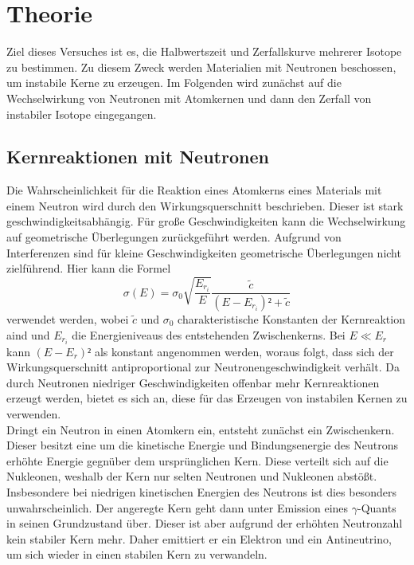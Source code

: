 \section{Theorie}
\label{sec:Theorie}

Ziel dieses Versuches ist es, die Halbwertszeit und Zerfallskurve mehrerer Isotope zu bestimmen.
Zu diesem Zweck werden Materialien mit Neutronen beschossen, um instabile Kerne zu erzeugen. Im 
Folgenden wird zunächst auf die Wechselwirkung von Neutronen mit Atomkernen und dann den Zerfall 
von instabiler Isotope eingegangen.

\subsection{Kernreaktionen mit Neutronen}
    Die Wahrscheinlichkeit für die Reaktion eines Atomkerns eines Materials mit einem Neutron wird
    durch den Wirkungsquerschnitt beschrieben. Dieser ist stark geschwindigkeitsabhängig. Für große 
    Geschwindigkeiten kann die Wechselwirkung auf geometrische Überlegungen zurückgeführt werden. 
    Aufgrund von Interferenzen sind für kleine Geschwindigkeiten geometrische Überlegungen nicht 
    zielführend. Hier kann die Formel
    \begin{equation*}
        \sigma (E) = \sigma_0 \sqrt{\dfrac{E_{r_i}}{E}}\dfrac{\tilde{c}}{(E-E_{r_i})²+\tilde{c}}
    \end{equation*}
    verwendet werden, wobei $\tilde{c}$ und $\sigma_0$ charakteristische Konstanten der Kernreaktion
    aind und $E_{r_i}$ die Energieniveaus des entstehenden Zwischenkerns. Bei $E \ll E_{r}$ kann 
    $(E-E_r)²$ als konstant angenommen werden, woraus folgt, dass sich der Wirkungsquerschnitt 
    antiproportional zur Neutronengeschwindigkeit verhält. Da durch Neutronen niedriger 
    Geschwindigkeiten offenbar mehr Kernreaktionen erzeugt werden, bietet es sich an, diese für 
    das Erzeugen von instabilen Kernen zu verwenden.\\
    Dringt ein Neutron in einen Atomkern ein, entsteht zunächst ein Zwischenkern. Dieser besitzt 
    eine um die kinetische Energie und Bindungsenergie des Neutrons erhöhte Energie gegnüber dem 
    ursprünglichen Kern. Diese verteilt sich auf die Nukleonen, weshalb der Kern nur selten Neutronen 
    und Nukleonen abstößt. Insbesondere bei niedrigen kinetischen Energien des Neutrons ist dies 
    besonders unwahrscheinlich. Der angeregte Kern geht dann unter Emission eines $\gamma$-Quants 
    in seinen Grundzustand über. Dieser ist aber aufgrund der erhöhten Neutronzahl kein stabiler 
    Kern mehr. Daher emittiert er ein Elektron und ein Antineutrino, um sich wieder in einen stabilen 
    Kern zu verwandeln.
